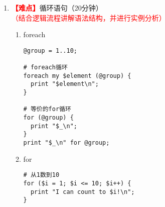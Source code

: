 \documentclass{TIJMUjiaoanLL}
\begin{document}
\begin{enumerate}
\begin{enumerate}
\begin{multicols}{2}
\begin{verbatim}
# given-when
use 5.010;
given ($foo) {
  say "a" when "a";
  when (/b/) {say "b";}
  default {say "not match";}
}
\end{verbatim}
\end{multicols}
\vspace*{-25pt}
      \item given-when
    \vspace*{-10pt}
    \begin{figure}[h]
      \centering
      \texttt{[image: c9.perl.unless.01.png]}
      \qquad \qquad
      \texttt{[image: c9.perl.given.01.png]}
    \end{figure}
    \vspace*{-10pt}

    \end{enumerate}


\otherTail
\newpage
\otherHeader


  \item \textcolor{red}{\textbf{【难点】}}循环语句（20分钟）\textcolor{red}{（结合逻辑流程讲解语法结构，并进行实例分析）}
    \begin{enumerate}
      \item foreach
\vspace*{-15pt}
\begin{figure}[h]
\end{figure}
\vspace*{-13pt}
\begin{verbatim}
@group = 1..10;

# foreach循环
foreach my $element (@group) {
  print "$element\n";
}

# 等价的for循环
for (@group) {
  print "$_\n";
}
print "$_\n" for @group;
\end{verbatim}
\vspace*{-5pt}

      \item for
\vspace*{-15pt}
\begin{figure}[h]
\end{figure}
\vspace*{-13pt}
\begin{verbatim}
# 从1数到10
for ($i = 1; $i <= 10; $i++) {
  print "I can count to $i!\n";
}
\end{verbatim}
\vspace*{-5pt}


\end{enumerate}
\end{enumerate}
\end{document}
